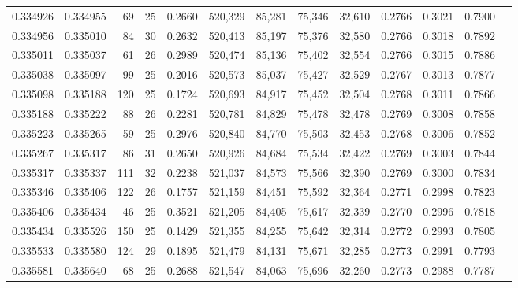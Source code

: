 \begin{tabular}{rrrrrrrrrrrrr}
0.334926 & 0.334955 &    69 &  25 &                                     0.2660 & 520,329 &  85,281 &  75,346 &  32,610 & 0.2766 & 0.3021 & 0.7900 \\
0.334956 & 0.335010 &    84 &  30 &                                     0.2632 & 520,413 &  85,197 &  75,376 &  32,580 & 0.2766 & 0.3018 & 0.7892 \\
0.335011 & 0.335037 &    61 &  26 &                                     0.2989 & 520,474 &  85,136 &  75,402 &  32,554 & 0.2766 & 0.3015 & 0.7886 \\
0.335038 & 0.335097 &    99 &  25 &                                     0.2016 & 520,573 &  85,037 &  75,427 &  32,529 & 0.2767 & 0.3013 & 0.7877 \\
0.335098 & 0.335188 &   120 &  25 &                                     0.1724 & 520,693 &  84,917 &  75,452 &  32,504 & 0.2768 & 0.3011 & 0.7866 \\
0.335188 & 0.335222 &    88 &  26 &                                     0.2281 & 520,781 &  84,829 &  75,478 &  32,478 & 0.2769 & 0.3008 & 0.7858 \\
0.335223 & 0.335265 &    59 &  25 &                                     0.2976 & 520,840 &  84,770 &  75,503 &  32,453 & 0.2768 & 0.3006 & 0.7852 \\
0.335267 & 0.335317 &    86 &  31 &                                     0.2650 & 520,926 &  84,684 &  75,534 &  32,422 & 0.2769 & 0.3003 & 0.7844 \\
0.335317 & 0.335337 &   111 &  32 &                                     0.2238 & 521,037 &  84,573 &  75,566 &  32,390 & 0.2769 & 0.3000 & 0.7834 \\
0.335346 & 0.335406 &   122 &  26 &                                     0.1757 & 521,159 &  84,451 &  75,592 &  32,364 & 0.2771 & 0.2998 & 0.7823 \\
0.335406 & 0.335434 &    46 &  25 &                                     0.3521 & 521,205 &  84,405 &  75,617 &  32,339 & 0.2770 & 0.2996 & 0.7818 \\
0.335434 & 0.335526 &   150 &  25 &                                     0.1429 & 521,355 &  84,255 &  75,642 &  32,314 & 0.2772 & 0.2993 & 0.7805 \\
0.335533 & 0.335580 &   124 &  29 &                                     0.1895 & 521,479 &  84,131 &  75,671 &  32,285 & 0.2773 & 0.2991 & 0.7793 \\
0.335581 & 0.335640 &    68 &  25 &                                     0.2688 & 521,547 &  84,063 &  75,696 &  32,260 & 0.2773 & 0.2988 & 0.7787 \\

\end{tabular}
